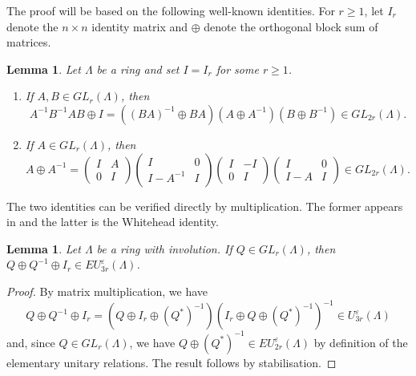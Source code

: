 \documentclass[11pt,a4paper,leqno]{amsart}
\newtheorem{lemma}[theorem]{Lemma}
\theoremstyle{definition}
\theoremstyle{remark}
\newenvironment{clist}[1]
{\begin{enumerate}[\normalfont #1]}
{\end{enumerate}}
\renewcommand{\l}{\Lambda}
\newcommand{\La}{\Lambda}
\newcommand{\ep}{\varepsilon}
\begin{document}
The proof will be based on the following well-known identities. For $r \ge 1$, let $I_r$ denote the $n \times n$ identity matrix and $\oplus$ denote the orthogonal block sum of matrices.

\begin{lemma} \label{lemma:identities}
Let $\l$ be a ring and set $I = I_r$ for some $r \geq 1$.
\begin{clist}{(i)}
\item
If $A, B \in GL_r(\l)$, then
\[
A^{-1}B^{-1}AB \oplus I = ((BA)^{-1} \oplus BA)(A \oplus A^{-1})(B\oplus B^{-1}) \in GL_{2r}(\l). \]
\item
If $A \in GL_r(\l)$, then
\[ A \oplus A^{-1} = \left(\begin{smallmatrix} I & A \\ 0 & I \end{smallmatrix}\right) \left(\begin{smallmatrix}I & 0 \\ I-A^{-1} & I \end{smallmatrix}\right)\left(\begin{smallmatrix} I & -I \\ 0 & I \end{smallmatrix}\right)\left(\begin{smallmatrix} I & 0 \\ I-A & I\end{smallmatrix}\right) \in GL_{2r}(\l).\]
\end{clist}
\end{lemma}

The two identities can be verified directly by multiplication. The former appears in \cite[Proof of Theorem 6.3]{Wall:1970} and the latter is the Whitehead identity.

\begin{lemma}\label{lem:3step}
 Let $\l$ be a ring with involution. If $Q \in GL_r(\La)$, then $Q \oplus Q^{-1}\oplus I_r \in EU^\ep_{3r}(\La)$.
\end{lemma}
\begin{proof} By matrix multiplication, we have 
$$Q \oplus Q^{-1}\oplus I_r =  \left ( Q \oplus I_r\oplus (Q^*)^{-1} \right ) \left (I_r \oplus Q\oplus (Q^*)^{-1} \right )^{-1}\in U^\ep_{3r}(\La)$$
and, since $Q \in GL_r(\La)$, we have $Q \oplus (Q^*)^{-1}  \in EU^\ep_{2r}(\La)$ by definition of the elementary unitary relations. The result follows by stabilisation.
\end{proof}
\end{document}
